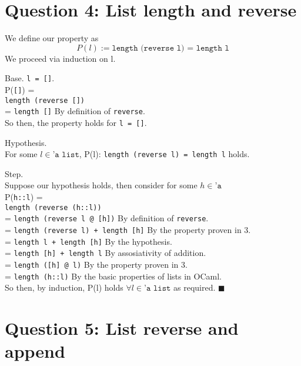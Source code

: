 \documentclass{article}
\begin{document}
\newpage




\section{Question 4: List length and reverse}
\noindent
We define our property as
\[ P(l) := \texttt{length (reverse l) = length l} \]
We proceed via induction on l.

\bigskip

\noindent
Base. \texttt{l = []}. \\
\indent P(\texttt{[]}) = \\
\indent \texttt{length (reverse [])} \\
\indent = \texttt{length []} \qquad By definition of \texttt{reverse}. \\
\noindent So then, the property holds for \texttt{l = []}.

\bigskip

\noindent
Hypothesis. \\
\indent For some $l \in \texttt{'a list}$, P(l): \texttt{length (reverse l) = length l} holds.

\bigskip

\noindent
Step. \\
Suppose our hypothesis holds, then consider for some $h \in \texttt{'a}$ \\
\indent P(\texttt{h::l}) = \\
\indent \texttt{length (reverse (h::l))} \\
\indent = \texttt{length (reverse l @ [h])} \qquad By definition of \texttt{reverse}. \\
\indent = \texttt{length (reverse l) + length [h]} \qquad By the property proven in 3. \\
\indent = \texttt{length l + length [h]} \qquad By the hypothesis. \\
\indent = \texttt{length [h] + length l} \qquad By assosiativity of addition. \\
\indent = \texttt{length ([h] @ l)} \qquad By the property proven in 3. \\
\indent = \texttt{length (h::l)} \qquad By the basic properties of lists in OCaml. \\
\noindent So then, by induction, P(l) holds $\forall l \in \texttt{'a list}$ as
required. $\blacksquare$




\newpage




\section{Question 5: List reverse and append}
\end{document}
